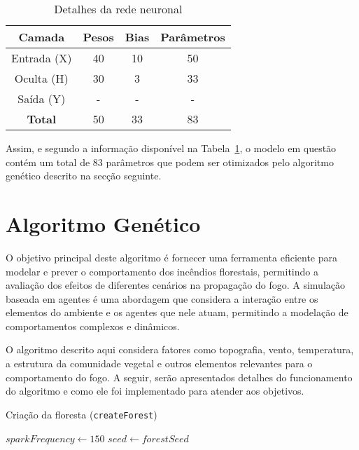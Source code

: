 \begin{table}[htpb]
    \centering
    \begin{tabular}{cccc}
        \hline
        Camada         & Pesos & Bias & Parâmetros \\ \hline
        Entrada (X)    & 40    & 10   & 50         \\
        Oculta (H)     & 30    & 3    & 33         \\
        Saída (Y)      & -     & -    & -          \\ \hline
        \textbf{Total} & 50    & 33   & 83         \\ \hline
    \end{tabular}
    \caption{Detalhes da rede neuronal}
    \label{tab:nn_summary}
\end{table}

Assim, e segundo a informação disponível na Tabela~\ref{tab:nn_summary}, o modelo em questão contém um total de 83 parâmetros que podem ser otimizados pelo algoritmo genético descrito na secção seguinte.


\section{Algoritmo Genético}\label{sec:gen_alg}

O objetivo principal deste algoritmo é fornecer uma ferramenta eficiente para modelar e prever o comportamento dos incêndios florestais, permitindo a avaliação dos efeitos de diferentes cenários na propagação do fogo.
A simulação baseada em agentes é uma abordagem que considera a interação entre os elementos do ambiente e os agentes que nele atuam, permitindo a modelação de comportamentos complexos e dinâmicos.

O algoritmo descrito aqui considera fatores como topografia, vento, temperatura, a estrutura da comunidade vegetal e outros elementos relevantes para o comportamento do fogo.
A seguir, serão apresentados detalhes do funcionamento do algoritmo e como ele foi implementado para atender aos objetivos.


\begin{algorithm}
    \caption{Criação da floresta (\texttt{createForest})}\label{alg:create_forest}
    $sparkFrequency \gets 150$\;
    $seed \gets forestSeed$\;
\end{algorithm}

